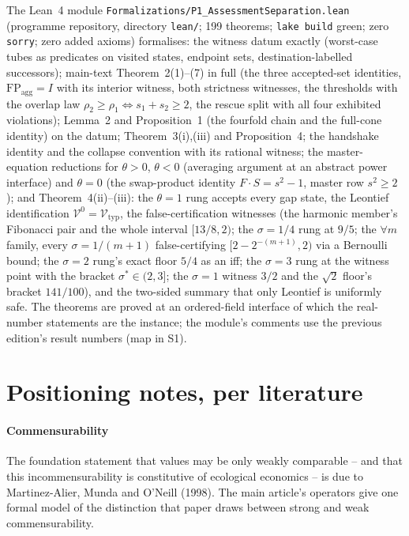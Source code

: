 \documentclass[preprint,11pt,authoryear]{elsarticle}
\theoremstyle{remark}
\newcommand{\Vtyp}{\mathcal{V}_{\mathrm{typ}}}
\newcommand{\FP}{\mathrm{FP}_{\mathrm{agg}}}
\begin{document}
The Lean~4 module \texttt{Formalizations/P1\_AssessmentSeparation.lean} (programme repository, directory \texttt{lean/}; 199 theorems; \texttt{lake build} green; zero \texttt{sorry}; zero added axioms) formalises: the witness datum exactly (worst-case tubes as predicates on visited states, endpoint sets, destination-labelled successors); main-text Theorem~2(1)--(7) in full (the three accepted-set identities, $\FP=I$ with its interior witness, both strictness witnesses, the thresholds with the overlap law $\rho_2\ge\rho_1\iff s_1+s_2\ge2$, the rescue split with all four exhibited violations); Lemma~2 and Proposition~1 (the fourfold chain and the full-cone identity) on the datum; Theorem~3(i),(iii) and Proposition~4; the handshake identity and the collapse convention with its rational witness; the master-equation reductions for $\theta>0$, $\theta<0$ (averaging argument at an abstract power interface) and $\theta=0$ (the swap-product identity $F\cdot S=s^2-1$, master row $s^2\ge2$); and Theorem~4(ii)--(iii): the $\theta=1$ rung accepts every gap state, the Leontief identification $\mathcal V^0=\Vtyp$, the false-certification witnesses (the harmonic member's Fibonacci pair and the whole interval $[13/8,2)$; the $\sigma=1/4$ rung at $9/5$; the $\forall m$ family, every $\sigma=1/(m+1)$ false-certifying $[2-2^{-(m+1)},2)$ via a Bernoulli bound; the $\sigma=2$ rung's exact floor $5/4$ as an iff; the $\sigma=3$ rung at the witness point with the bracket $\sigma^*\in(2,3]$; the $\sigma=1$ witness $3/2$ and the $\sqrt2$ floor's bracket $141/100$), and the two-sided summary that only Leontief is uniformly safe. The theorems are proved at an ordered-field interface of which the real-number statements are the instance; the module's comments use the previous edition's result numbers (map in S1).

\section{Positioning notes, per literature}\label{si:positioning}

\paragraph{Commensurability} The foundation statement that values may be only weakly comparable -- and that this incommensurability is constitutive of ecological economics -- is due to Martinez-Alier, Munda and O'Neill (1998). The main article's operators give one formal model of the distinction that paper draws between strong and weak commensurability.
\end{document}
